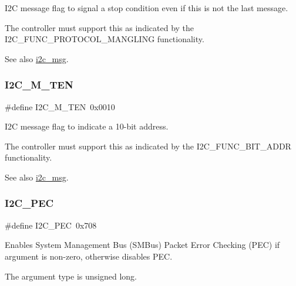 I2C message flag to signal a stop condition even if this is not the last message. 

The controller must support this as indicated by the I2\+C\+\_\+\+F\+U\+N\+C\+\_\+\+P\+R\+O\+T\+O\+C\+O\+L\+\_\+\+M\+A\+N\+G\+L\+I\+NG functionality.

\begin{DoxySeeAlso}{See also}
\mbox{\hyperlink{structi2c__msg}{i2c\+\_\+msg}}. 
\end{DoxySeeAlso}
\mbox{\label{group__I2CLinux_gabe53ff15e0717ccbd1d4c656c09ee53a}} 
\subsubsection{\texorpdfstring{I2C\_M\_TEN}{I2C\_M\_TEN}}
{\footnotesize\ttfamily \#define I2\+C\+\_\+\+M\+\_\+\+T\+EN~0x0010}



I2C message flag to indicate a 10-\/bit address. 

The controller must support this as indicated by the I2\+C\+\_\+\+F\+U\+N\+C\+\_\+B\+I\+T\+\_\+\+A\+D\+DR functionality.

\begin{DoxySeeAlso}{See also}
\mbox{\hyperlink{structi2c__msg}{i2c\+\_\+msg}}. 
\end{DoxySeeAlso}
\mbox{\label{group__I2CLinux_ga2a72d7072db21c407f82e6e73854b38f}} 
\subsubsection{\texorpdfstring{I2C\_PEC}{I2C\_PEC}}
{\footnotesize\ttfamily \#define I2\+C\+\_\+\+P\+EC~0x708}



Enables System Management Bus (S\+M\+Bus) Packet Error Checking (P\+EC) if argument is non-\/zero, otherwise disables P\+EC. 

The argument type is unsigned long. \mbox{\label{group__I2CLinux_ga7645f9831bcbbae2339fcff4d85691be}} 
